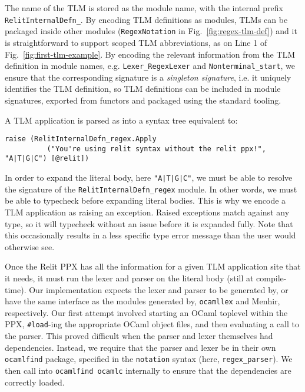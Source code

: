 \documentclass[acmsmall]{acmart}
\newcommand{\li}[1]{\lstinline[basicstyle=\ttfamily\fontsize{9pt}{1em}\selectfont]{#1}}
\theoremstyle{slplain}
\numberwithin{thm}{section}
\begin{document}
The name of the TLM is stored as the module name, with the internal prefix \li{RelitInternalDefn_}. By encoding TLM definitions as modules, TLMs can be packaged inside other modules (\li{RegexNotation} in Fig.~\ref{fig:regex-tlm-def}) and it is straightforward to support scoped TLM abbreviations, as on Line 1 of Fig.~\ref{fig:first-tlm-example}. By encoding the relevant information from the TLM definition in module names, e.g. \li{Lexer_RegexLexer} and \li{Nonterminal_start}, we ensure that the corresponding signature is a \emph{singleton signature}, i.e. it uniquely identifies the TLM definition, so TLM definitions can be included in module signatures, exported from functors and packaged using the standard tooling.

A TLM application is parsed as into a syntax tree equivalent to:
\begin{lstlisting}[numbers=none]
  raise (RelitInternalDefn_regex.Apply
          ("You're using relit syntax without the relit ppx!", "A|T|G|C") [@relit])
\end{lstlisting}

In order to expand the literal body, here \li{"A|T|G|C"}, we must be able to resolve the signature of the \li{RelitInternalDefn_regex} module. In other words, we must be able to typecheck before expanding literal bodies. This is why we encode a TLM application as raising an exception. Raised exceptions match against any type, so it will typecheck without an issue before it is expanded fully. Note that this occasionally results in a less specific type error message than the user would otherwise see. 

Once the Relit PPX has all the information for a given TLM application site that it needs, it must run the lexer and parser on the literal body (still at compile-time).  Our implementation expects the lexer and parser to be generated by, or have the same interface as the modules generated by, \li{ocamllex} and Menhir, respectively. Our first attempt involved starting an OCaml toplevel within the PPX, \li{#load}-ing the appropriate OCaml object files, and then evaluating a call to the parser. This proved difficult when the parser and lexer themselves had dependencies. Instead, we require that the parser and lexer be in their own \li{ocamlfind} package, specified in the \li{notation} syntax (here, \li{regex_parser}). We then call into \li{ocamlfind ocamlc} internally to ensure that the dependencies are correctly loaded.
\end{document}
